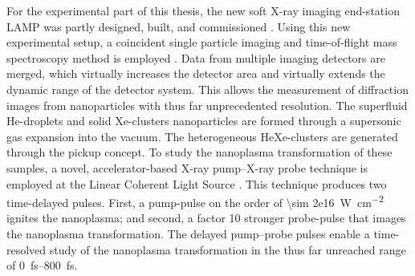 For the experimental part of this thesis, the new soft X-ray imaging end-station LAMP was partly designed, built, and commissioned \citep{Ferguson-2015-JSR}. Using this new experimental setup, a coincident single particle imaging and time-of-flight mass spectroscopy method is employed \cite{Gorkhover-2012-PRL}. Data from multiple imaging detectors are merged, which virtually increases the detector area and virtually extends the dynamic range of the detector system. This allows the measurement of diffraction images from nanoparticles with thus far unprecedented resolution. The superfluid He-droplets and solid Xe-clusters nanoparticles are formed through a supersonic gas expansion into the vacuum. The heterogeneous HeXe-clusters are generated through the pickup concept. To study the nanoplasma transformation of these samples, a novel, accelerator-based X-ray pump--X-ray probe technique is employed at the Linear Coherent Light Source \cite{Lutman-2013-PRL}. This technique produces two time-delayed pulses. First, a pump-pulse on the order of \SI{\sim 2e16}{\watt\per\square\centi\meter} ignites the nanoplasma; and second, a factor 10 stronger probe-pulse that images the nanoplasma transformation. The delayed pump--probe pulses enable a time-resolved study of the nanoplasma transformation in the thus far unreached range of \SIrange{0}{800}{\femto\second}.\\[1\baselineskip]

